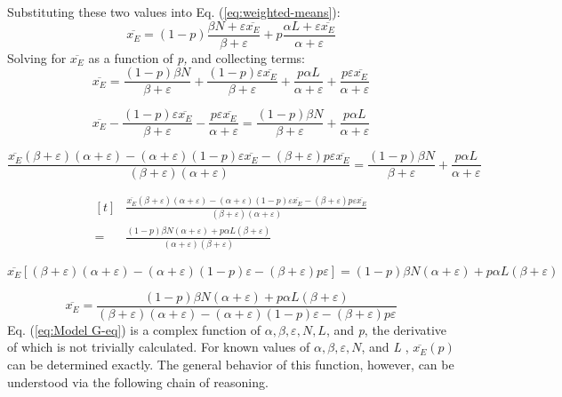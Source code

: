 Substituting these two values into Eq. (\ref{eq:weighted-means}):
\begin{equation}
\overline{x_{E}}=(1-p)\frac{\beta N+\varepsilon\overline{x_{E}}}{\beta+\varepsilon}+p\frac{\alpha L+\varepsilon\overline{x_{E}}}{\alpha+\varepsilon}
\end{equation}
Solving for $\overline{x_{E}}$ as a function of \emph{p, }and collecting
terms:
\begin{equation}
\overline{x_{E}}=\frac{(1-p)\beta N}{\beta+\varepsilon}+\frac{(1-p)\varepsilon\overline{x_{E}}}{\beta+\varepsilon}+\frac{p\alpha L}{\alpha+\varepsilon}+\frac{p\varepsilon\overline{x_{E}}}{\alpha+\varepsilon}
\end{equation}

\begin{equation}
\overline{x_{E}}-\frac{(1-p)\varepsilon\overline{x_{E}}}{\beta+\varepsilon}-\frac{p\varepsilon\overline{x_{E}}}{\alpha+\varepsilon}=\frac{(1-p)\beta N}{\beta+\varepsilon}+\frac{p\alpha L}{\alpha+\varepsilon}
\end{equation}

\begin{equation}
\frac{\overline{x_{E}}(\beta+\varepsilon)(\alpha+\varepsilon)-(\alpha+\varepsilon)(1-p)\varepsilon\overline{x_{E}}-(\beta+\varepsilon)p\varepsilon\overline{x_{E}}}{(\beta+\varepsilon)(\alpha+\varepsilon)}=\frac{(1-p)\beta N}{\beta+\varepsilon}+\frac{p\alpha L}{\alpha+\varepsilon}
\end{equation}

\begin{equation}
\begin{aligned}[t]
& \frac{\overline{x_{E}}(\beta+\varepsilon)(\alpha+\varepsilon)-(\alpha+\varepsilon)(1-p)\varepsilon\overline{x_{E}}-(\beta+\varepsilon)p\varepsilon\overline{x_{E}}}{(\beta+\varepsilon)(\alpha+\varepsilon)}\\
= &\frac{(1-p)\beta N(\alpha+\varepsilon)+p\alpha L(\beta+\varepsilon)}{(\alpha+\varepsilon)(\beta+\varepsilon)}
\end{aligned}
\end{equation}

\begin{equation}
\overline{x_{E}}[(\beta+\varepsilon)(\alpha+\varepsilon)-(\alpha+\varepsilon)(1-p)\varepsilon-(\beta+\varepsilon)p\varepsilon]=(1-p)\beta N(\alpha+\varepsilon)+p\alpha L(\beta+\varepsilon)
\end{equation}

\begin{equation}
\overline{x_{E}}=\frac{(1-p)\beta N(\alpha+\varepsilon)+p\alpha L(\beta+\varepsilon)}{(\beta+\varepsilon)(\alpha+\varepsilon)-(\alpha+\varepsilon)(1-p)\varepsilon-(\beta+\varepsilon)p\varepsilon}\label{eq:Model G-eq}
\end{equation}
Eq. (\ref{eq:Model G-eq}) is a complex function of $\alpha,\beta,\varepsilon,N,L$,
and \emph{p}, the derivative of which is not trivially calculated.
For known values of $\alpha,\beta,\varepsilon,N$, and \emph{L} ,
$\overline{x_{E}}(p)$ can be determined exactly. The general behavior
of this function, however, can be understood via the following chain
of reasoning. 

